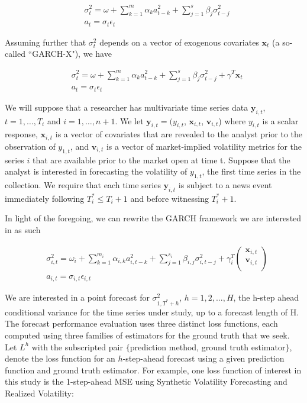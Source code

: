 \documentclass[11pt]{article}
\newcommand{\x}{\textbf{x}}
\newcommand{\y}{\textbf{y}}
\theoremstyle{definition}
\begin{document}
\begin{align*}
&\sigma_{t}^{2} = \omega + \sum^{m}_{k=1}\alpha_{k}a^{2}_{t-k} + \sum_{j=1}^{s}\beta_{j}\sigma_{t-j}^{2}\\
&a_{t} = \sigma_{t}\epsilon_{t}
\end{align*}

Assuming further that $\sigma^{2}_{t}$ depends on a vector of exogenous covariates $\x_{t}$ (a so-called ``GARCH-X"), we have

\begin{align*}
&\sigma_{t}^{2} = \omega+ \sum^{m}_{k=1}\alpha_{k}a^{2}_{t-k} + \sum_{j=1}^{s}\beta_{j}\sigma_{t-j}^{2} + \gamma^{T}\x_{t}\\
&a_{t} = \sigma_{t}\epsilon_{t}
\end{align*}


We will suppose that a researcher has multivariate time series data $\y_{i,t}$, $t = 1, \ldots,  T_i$ and $i = 1, \ldots, n+1$. We let $\y_{i,t} = (y_{i,t}$, $\x_{i,t}$, $\textbf{v}_{i,t}$) where $y_{i,t}$ is a scalar response,  $\x_{i,t}$ is a vector of covariates that are revealed to the analyst prior to the observation of $y_{1,t}$, and $\textbf{v}_{i,t}$ is a vector of market-implied volatility metrics for the series $i$ that are available prior to the market open at time t.  Suppose that the analyst is interested in forecasting the volatility of $y_{1,t}$, the first time series in the collection.  We require that each time series $\y_{i,t}$ is subject to a news event immediately following $T^*_i \leq T_i + 1$ and before witnessing $T^*_i+1$. 

In light of the foregoing, we can rewrite the GARCH framework we are interested in as such

\begin{align*}
&\sigma_{i,t}^{2} = \omega_{i} + \sum^{m_{i}}_{k=1}\alpha_{i,k}a^{2}_{i,t-k} + \sum_{j=1}^{s_{i}}\beta_{i,j}\sigma_{i,t-j}^{2} + \gamma_{i}^{T} \begin{pmatrix} \x_{i,t} \\ \textbf{v}_{i,t} \\ \end{pmatrix} \\
&a_{i,t} = \sigma_{i,t}\epsilon_{i,t}
\end{align*}


We are interested in a point forecast for $\sigma^{2}_{1,T^{*}+h}$, $h=1,2,...,H$, the h-step ahead conditional variance for the time series under study, up to a forecast length of H.  The forecast performance evaluation uses three distinct loss functions, each computed using three families of estimators for the ground truth that we seek.  Let $L^{h}$ with the subscripted pair $\{$prediction method, ground truth estimator$\}$, denote the loss function for an $h$-step-ahead forecast using a given prediction function and ground truth estimator.  For example, one loss function of interest in this study is the 1-step-ahead MSE using Synthetic Volatility Forecasting and Realized Volatility:
\end{document}
